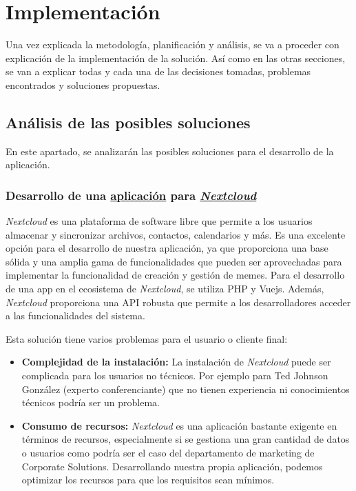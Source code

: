 \chapter{Implementación}

Una vez explicada la metodología, planificación y análisis, se va a proceder con explicación de la implementación de la solución. Así como en las otras secciones, se van a explicar todas y cada una de las decisiones tomadas, problemas encontrados y soluciones propuestas.

\section{Análisis de las posibles soluciones}

En este apartado, se analizarán las posibles soluciones para el desarrollo de la aplicación.

\subsection{Desarrollo de una \href{https://apps.nextcloud.com/}{aplicación} para \href{https://nextcloud.com/es/}{\textit{Nextcloud}}}

\textit{Nextcloud} es una plataforma de software libre que permite a los usuarios almacenar y sincronizar archivos, contactos, calendarios y más. Es una excelente opción para el desarrollo de nuestra aplicación, ya que proporciona una base sólida y una amplia gama de funcionalidades que pueden ser aprovechadas para implementar la funcionalidad de creación y gestión de memes. Para el desarrollo de una app en el ecosistema de \textit{Nextcloud}, se utiliza PHP y Vuejs. Además, \textit{Nextcloud} proporciona una API robusta que permite a los desarrolladores acceder a las funcionalidades del sistema.

Esta solución tiene varios problemas para el usuario o cliente final: 

\begin{itemize}
    \item \textbf{Complejidad de la instalación:} La instalación de \textit{Nextcloud} puede ser complicada para los usuarios no técnicos. Por ejemplo para Ted Johnson González (experto conferenciante) que no tienen experiencia ni conocimientos técnicos podría ser un problema.
    \item \textbf{Consumo de recursos:} \textit{Nextcloud} es una aplicación bastante exigente en términos de recursos, especialmente si se gestiona una gran cantidad de datos o usuarios como podría ser el caso del departamento de marketing de Corporate Solutions. Desarrollando nuestra propia aplicación, podemos optimizar los recursos para que los requisitos sean mínimos.
\end{itemize}

